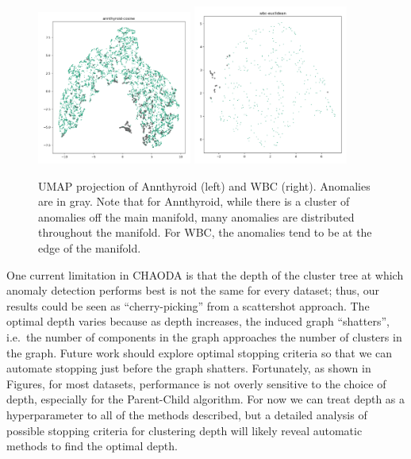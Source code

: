 \begin{figure}
    \centering
    \includegraphics[width=2in]{images/umaps/annthyroid-cosine-umap2d.png}
    \includegraphics[width=2in]{images/umaps/wbc-euclidean-umap2d.png}
    \caption{UMAP projection of Annthyroid (left) and WBC (right). Anomalies are in gray. Note that for Annthyroid, while there is a cluster of anomalies off the main manifold, many anomalies are distributed throughout the manifold. For WBC, the anomalies tend to be at the edge of the manifold.}
    \label{fig:conclusions:umap-embeddings}
\end{figure}

One current limitation in CHAODA is that the depth of the cluster tree at which anomaly detection performs best is not the same for every dataset;
thus, our results could be seen as ``cherry-picking'' from a scattershot approach.
The optimal depth varies because as depth increases, the induced graph ``shatters'', i.e.\ the number of components in the graph approaches the number of clusters in the graph.
Future work should explore optimal stopping criteria so that we can automate stopping just before the graph shatters.
Fortunately, as shown in Figures, for most datasets, performance is not overly sensitive to the choice of depth, especially for the Parent-Child algorithm.
For now we can treat depth as a hyperparameter to all of the methods described, but a detailed analysis of possible stopping criteria for clustering depth will likely reveal automatic methods to find the optimal depth.

